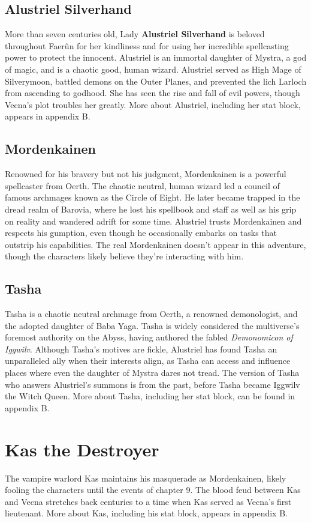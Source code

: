 \documentclass[10pt,a4paper,twoside,bg=print,twocolumn,openany,nodeprecatedcode]{dndbook}
\begin{document}
\subsection{Alustriel Silverhand}
More than seven centuries old, Lady \textbf{Alustriel Silverhand} is beloved throughout Faerûn for her kindliness and for using her incredible spellcasting power to protect the innocent. Alustriel is an immortal daughter of Mystra, a god of magic, and is a chaotic good, human wizard. Alustriel served as High Mage of Silverymoon, battled demons on the Outer Planes, and prevented the lich Larloch from ascending to godhood. She has seen the rise and fall of evil powers, though Vecna's plot troubles her greatly. More about Alustriel, including her stat block, appears in appendix B.

\subsection{Mordenkainen}
Renowned for his bravery but not his judgment, Mordenkainen is a powerful spellcaster from Oerth. The chaotic neutral, human wizard led a council of famous archmages known as the Circle of Eight. He later became trapped in the dread realm of Barovia, where he lost his spellbook and staff as well as his grip on reality and wandered adrift for some time. Alustriel trusts Mordenkainen and respects his gumption, even though he occasionally embarks on tasks that outstrip his capabilities. The real Mordenkainen doesn't appear in this adventure, though the characters likely believe they're interacting with him.

\subsection{Tasha}
Tasha is a chaotic neutral archmage from Oerth, a renowned demonologist, and the adopted daughter of Baba Yaga. Tasha is widely considered the multiverse's foremost authority on the Abyss, having authored the fabled \textit{Demonomicon of Iggwilv}. Although Tasha's motives are fickle, Alustriel has found Tasha an unparalleled ally when their interests align, as Tasha can access and influence places where even the daughter of Mystra dares not tread. The version of Tasha who answers Alustriel's summons is from the past, before Tasha became Iggwilv the Witch Queen. More about Tasha, including her stat block, can be found in appendix B.

\section{Kas the Destroyer}
The vampire warlord Kas maintains his masquerade as Mordenkainen, likely fooling the characters until the events of chapter 9. The blood feud between Kas and Vecna stretches back centuries to a time when Kas served as Vecna's first lieutenant. More about Kas, including his stat block, appears in appendix B.
\end{document}
